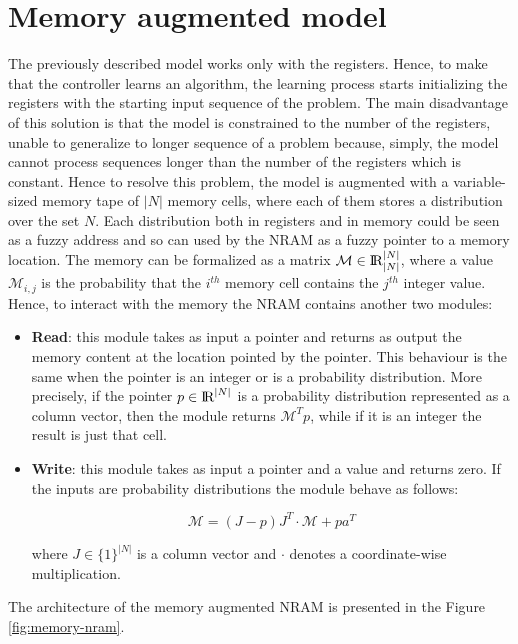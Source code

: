 \section{Memory augmented model}\label{sec:nram-memory}
The previously described model works only with the registers. Hence, to make that the controller learns an algorithm, the learning process starts initializing the registers with the starting input sequence of the problem. The main disadvantage of this solution is that the model is constrained to the number of the registers, unable to generalize to longer sequence of a problem because, simply, the model cannot process sequences longer than the number of the registers which is constant.\newline\newline
Hence to resolve this problem, the model is augmented with a variable-sized memory tape of $|N|$ memory cells, where each of them stores a distribution over the set $N$. Each distribution both in registers and in memory could be seen as a fuzzy address and so can used by the NRAM as a fuzzy pointer to a memory location. The memory can be formalized as a matrix $\mathcal{M} \in \textrm{I\!R}_{|N|}^{|N|}$, where a value $\mathcal{M}_{i,j}$ is the probability that the $i^{th}$ memory cell contains the $j^{th}$ integer value.\newline\newline
Hence, to interact with the memory the NRAM contains another two modules:
\begin{itemize}
	\item{\textbf{Read}: this module takes as input a pointer and returns as output the memory content at the location pointed by the pointer. This behaviour is the same when the pointer is an integer or is a probability distribution. More precisely, if the pointer $p\in\textrm{I\!R}^{|N|}$ is a probability distribution represented as a column vector, then the module returns $\mathcal{M}^{T}p$, while if it is an integer the result is just that cell.}
	\item{\textbf{Write}: this module takes as input a pointer and a value and returns zero. If the inputs are probability distributions the module behave as follows:
\begin{center}
	\begin{equation}
	\mathcal{M} = (J - p)J^{T} \cdot \mathcal{M} + pa^{T}
	\end{equation}
\end{center}	
where $J \in \{1\}^{|N|}$ is a column vector and $\cdot$ denotes a coordinate-wise multiplication.}
\end{itemize}
The architecture of the memory augmented NRAM is presented in the Figure \ref{fig:memory-nram}.

